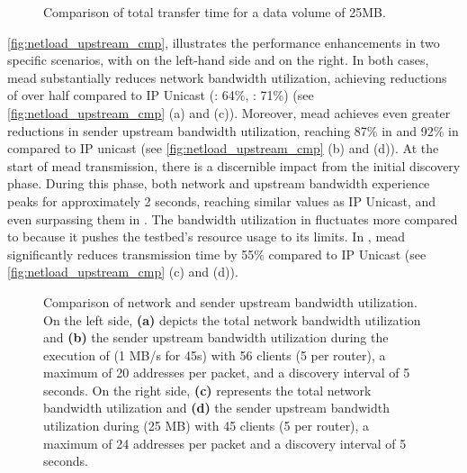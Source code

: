 \begin{figure}
    \begin{center}
        
    \end{center}
    \caption[UC2 File transfer: Comparison of transfer time]{
        \nucii{} Comparison of total transfer time for a data volume of 25MB.
    }
    \label{fig:trans_time}
\end{figure}


\autoref{fig:netload_upstream_cmp}, illustrates the performance enhancements in
    two specific scenarios, with \uci{} on the left-hand side and \ucii{} on
    the right.
In both cases, \gls{mead} substantially reduces network bandwidth utilization,
    achieving reductions of over half compared to IP Unicast (\uci{}: 64\%,
    \ucii{}: 71\%) (see \autoref{fig:netload_upstream_cmp} (a) and (c)).
Moreover, \gls{mead} achieves even greater reductions in sender upstream
    bandwidth utilization, reaching 87\% in \uci{} and 92\% in \ucii{} compared
    to IP unicast (see \autoref{fig:netload_upstream_cmp} (b) and (d)).
At the start of \gls{mead} transmission, there is a discernible impact from the
    initial discovery phase.
During this phase, both network and upstream bandwidth experience peaks for
    approximately 2 seconds, reaching similar values as IP Unicast, and even
    surpassing them in \ucii{}.
The bandwidth utilization in \ucii{} fluctuates more compared to \uci{} because
    it pushes the testbed's resource usage to its limits.
In \ucii{}, \gls{mead} significantly reduces transmission time by 55\% compared to
    IP Unicast (see \autoref{fig:netload_upstream_cmp} (c) and (d)).

\begin{figure}
    \begin{center}
        
    \end{center}
    \caption[Comparison of network and sender upstream bandwidth utilization]{
        Comparison of network and sender upstream bandwidth utilization.
        On the left side, \textbf{(a)} depicts the total network bandwidth
        utilization and \textbf{(b)} the sender upstream bandwidth utilization
        during the execution of \nuci{} (1 MB/s for 45s) with 56 clients
        (5 per router), a maximum of 20 addresses per packet, and a discovery
        interval of 5 seconds.
        On the right side, \textbf{(c)} represents the total network bandwidth
        utilization and \textbf{(d)} the sender upstream bandwidth utilization
        during \nucii{} (25 MB) with 45 clients (5 per router), a
        maximum of 24 addresses per packet and a discovery interval of 5
        seconds.
    }
    \label{fig:netload_upstream_cmp}
\end{figure}



